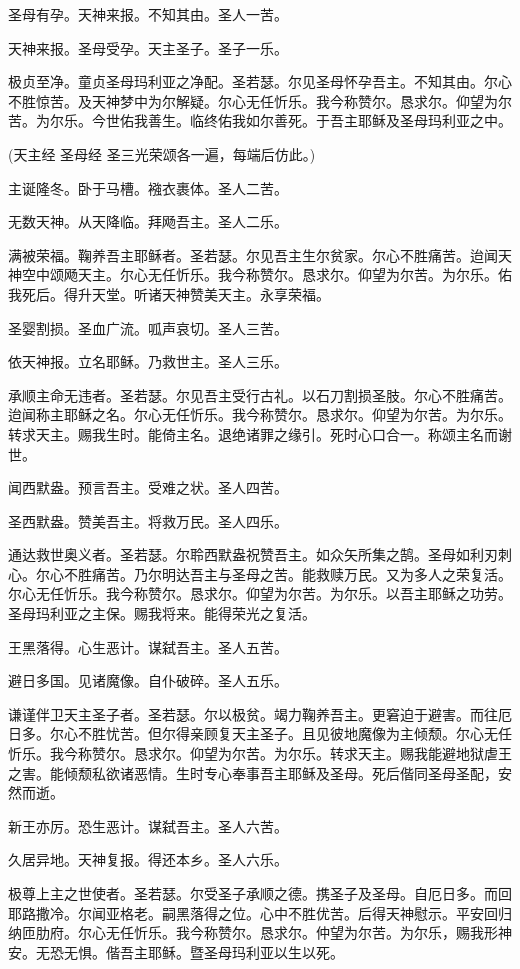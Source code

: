 \documentclass[UTF8,17pt]{ctexart}
\begin{document}
圣母有孕。天神来报。不知其由。圣⼈⼀苦。

天神来报。圣母受孕。天主圣⼦。圣⼦⼀乐。

极贞⾄净。童贞圣母玛利亚之净配。圣若瑟。尔见圣母怀孕吾主。不知其由。尔⼼不胜惊苦。及天神梦中为尔解疑。尔⼼⽆任忻乐。我今称赞尔。恳求尔。仰望为尔苦。为尔乐。今世佑我善⽣。临终佑我如尔善死。于吾主耶稣及圣母玛利亚之中。

(天主经 \; 圣母经 \; 圣三光荣颂各⼀遍，每端后仿此。)

主诞隆冬。卧于马槽。襁⾐裹体。圣⼈⼆苦。

⽆数天神。从天降临。拜飏吾主。圣⼈⼆乐。

满被荣福。鞠养吾主耶稣者。圣若瑟。尔见吾主⽣尔贫家。尔⼼不胜痛苦。迨闻天神空中颂飏天主。尔⼼⽆任忻乐。我今称赞尔。恳求尔。仰望为尔苦。为尔乐。佑我死后。得升天堂。听诸天神赞美天主。永享荣福。

圣婴割损。圣⾎⼴流。呱声哀切。圣⼈三苦。

依天神报。⽴名耶稣。乃救世主。圣⼈三乐。

承顺主命⽆违者。圣若瑟。尔见吾主受⾏古礼。以⽯⼑割损圣肢。尔⼼不胜痛苦。迨闻称主耶稣之名。尔⼼⽆任忻乐。我今称赞尔。恳求尔。仰望为尔苦。为尔乐。转求天主。赐我⽣时。能倚主名。退绝诸罪之缘引。死时⼼口合⼀。称颂主名⽽谢世。

闻西默盎。预⾔吾主。受难之状。圣⼈四苦。

圣西默盎。赞美吾主。将救万民。圣⼈四乐。

通达救世奥义者。圣若瑟。尔聆西默盎祝赞吾主。如众⽮所集之鹄。圣母如利刃刺⼼。尔⼼不胜痛苦。乃尔明达吾主与圣母之苦。能救赎万民。又为多⼈之荣复活。尔⼼⽆任忻乐。我今称赞尔。恳求尔。仰望为尔苦。为尔乐。以吾主耶稣之功劳。圣母玛利亚之主保。赐我将来。能得荣光之复活。

王⿊落得。⼼⽣恶计。谋弑吾主。圣⼈五苦。

避⽇多国。见诸魔像。⾃仆破碎。圣⼈五乐。

谦谨伴卫天主圣⼦者。圣若瑟。尔以极贫。竭力鞠养吾主。更窘迫于避害。⽽往厄⽇多。尔⼼不胜忧苦。但尔得亲顾复天主圣⼦。且见彼地魔像为主倾颓。尔⼼⽆任忻乐。我今称赞尔。恳求尔。仰望为尔苦。为尔乐。转求天主。赐我能避地狱虐王之害。能倾颓私欲诸恶情。⽣时专⼼奉事吾主耶稣及圣母。死后偕同圣母圣配，安然⽽逝。

新王亦厉。恐⽣恶计。谋弑吾主。圣⼈六苦。

久居异地。天神复报。得还本乡。圣⼈六乐。

极尊上主之世使者。圣若瑟。尔受圣⼦承顺之德。携圣⼦及圣母。⾃厄⽇多。⽽回耶路撒冷。尔闻亚格⽼。嗣⿊落得之位。⼼中不胜优苦。后得天神慰⽰。平安回归纳匝肋府。尔⼼⽆任忻乐。我今称赞尔。恳求尔。仲望为尔苦。为尔乐，赐我形神安。⽆恐⽆惧。偕吾主耶稣。暨圣母玛利亚以⽣以死。
\end{document}
